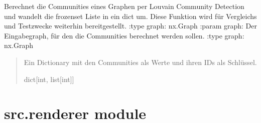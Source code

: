 \documentclass[a4paper,10pt,ngerman]{sphinxmanual}
\begin{document}
\begin{fulllineitems}
\label{\detokenize{api:src.partitioning.louvain_community_detection}}
\pysigstartsignatures
\pysiglinewithargsret
{}
{}
{}
\pysigstopsignatures
\sphinxAtStartPar
Berechnet die Communities eines Graphen per Louvain Community Detection und wandelt die frozenset Liste in ein dict um.
Diese Funktion wird für Vergleichs\sphinxhyphen{} und Testzwecke weiterhin bereitgestellt.
:type graph: nx.Graph
:param graph: Der Eingabegraph, für den die Communities berechnet werden sollen.
:type graph: nx.Graph
\begin{quote}\begin{description}
\sphinxAtStartPar
Ein Dictionary mit den Communities als Werte und ihren IDs als Schlüssel.

\sphinxAtStartPar
dict{[}int, list{[}int{]}{]}

\end{description}\end{quote}

\end{fulllineitems}



\section{src.renderer module}
\label{\detokenize{api:module-src.renderer}}\label{\detokenize{api:src-renderer-module}}
\end{document}

